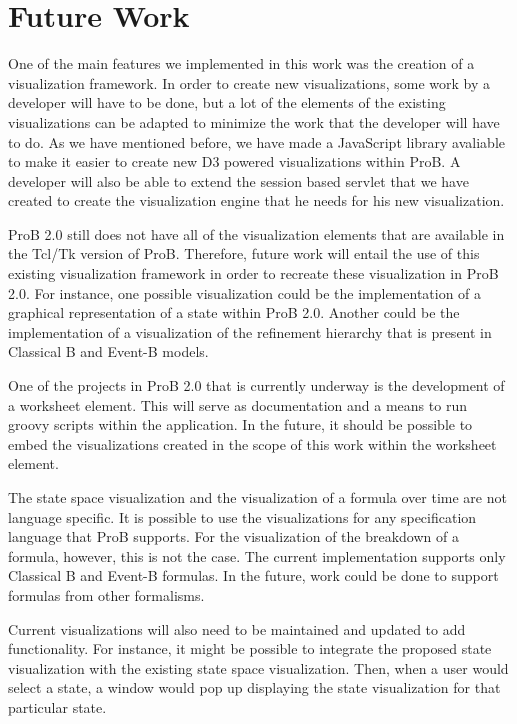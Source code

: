\section{Future Work}

One of the main features we implemented in this work was the creation of a visualization framework. In order to create new visualizations, some work by a developer will have to be done, but a lot of the elements of the existing visualizations can be adapted to minimize the work that the developer will have to do. As we have mentioned before, we have made a JavaScript library avaliable to make it easier to create new D3 powered visualizations within ProB. A developer will also be able to extend the session based servlet that we have created to create the visualization engine that he needs for his new visualization.

ProB 2.0 still does not have all of the visualization elements that are available in the Tcl/Tk version of ProB. Therefore, future work will entail the use of this existing visualization framework in order to recreate these visualization in ProB 2.0. For instance, one possible visualization could be the implementation of a graphical representation of a state within ProB 2.0. Another could be the implementation of a visualization of the refinement hierarchy that is present in Classical B and Event-B models.

One of the projects in ProB 2.0 that is currently underway is the development of a worksheet element. This will serve as documentation and a means to run groovy scripts within the application. In the future, it should be possible to embed the visualizations created in the scope of this work within the worksheet element. 

The state space visualization and the visualization of a formula over time are not language specific. It is possible to use the visualizations for any specification language that ProB supports. For the visualization of the breakdown of a formula, however, this is not the case. The current implementation supports only Classical B and Event-B formulas. In the future, work could be done to support formulas from other formalisms.

Current visualizations will also need to be maintained and updated to add functionality. For instance, it might be possible to integrate the proposed state visualization with the existing state space visualization. Then, when a user would select a state, a window would pop up displaying the state visualization for that particular state.